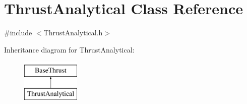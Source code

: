 \hypertarget{class_thrust_analytical}{}\section{Thrust\+Analytical Class Reference}
\label{class_thrust_analytical}


{\ttfamily \#include $<$Thrust\+Analytical.\+h$>$}

Inheritance diagram for Thrust\+Analytical\+:\begin{figure}[H]
\begin{center}
\leavevmode
\includegraphics[height=2.000000cm]{class_thrust_analytical}
\end{center}
\end{figure}
